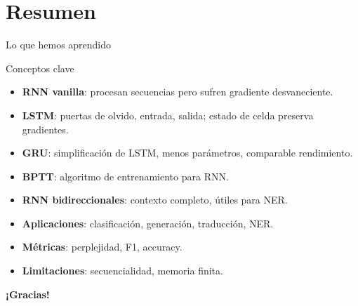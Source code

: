 \documentclass[aspectratio=169, 10pt, xcolor=table]{beamer}
\begin{document}
\section{Resumen}

\begin{frame}{Lo que hemos aprendido}
    \begin{exampleblock}{Conceptos clave}
        \begin{itemize}
            \item \textbf{RNN vanilla}: procesan secuencias pero sufren gradiente desvaneciente.
            \item \textbf{LSTM}: puertas de olvido, entrada, salida; estado de celda preserva gradientes.
            \item \textbf{GRU}: simplificación de LSTM, menos parámetros, comparable rendimiento.
            \item \textbf{BPTT}: algoritmo de entrenamiento para RNN.
            \item \textbf{RNN bidireccionales}: contexto completo, útiles para NER.
            \item \textbf{Aplicaciones}: clasificación, generación, traducción, NER.
            \item \textbf{Métricas}: perplejidad, F1, accuracy.
            \item \textbf{Limitaciones}: secuencialidad, memoria finita.
        \end{itemize}
    \end{exampleblock}
\end{frame}

\begin{frame}
    \centering
    \Huge \textbf{¡Gracias!}

\end{frame}
\end{document}
